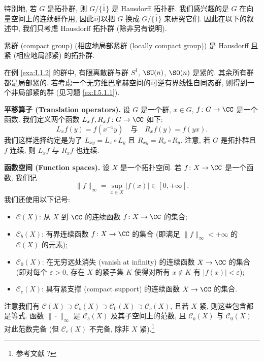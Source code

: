 \begin{remark}[Hausdorff 化]
\label{rem:I.1.8}
特别地, 若 $G$ 是拓扑群, 则 $G/\overline{\{1\}}$ 是 Hausdorff 拓扑群. 我们感兴趣的是 $G$ 在向量空间上的连续群作用, 因此可以把 $G$ 换成 $G/\overline{\{1\}}$ 来研究它们. 因此在以下的叙述中, 我们只考虑 Hausdorff 拓扑群 (除非另有说明).
\end{remark}

\begin{definition}
\label{def:I.1.9}
紧群 (compact group) (相应地局部紧群 (locally compact group)) 是 Hausdorff 且紧 (相应地局部紧) 的拓扑群.
\end{definition}

\begin{example}[紧群与局部紧群的例子]
\label{exa:I.1.10}
在例 \ref{exa:I.1.2} 的群中, 有限离散群与群 $S^1$, $\SU(n)$, $\SO(n)$ 是紧的. 其余所有群都是局部紧的. 若考虑一个无穷维巴拿赫空间的可逆有界线性自同态群, 则得到一个非局部紧的群 (见习题 \ref{ex:I.5.1.1}).
\end{example}

\textbf{平移算子 (Translation operators).} 设 $G$ 是一个群, $x \in G$, $f \colon G \to \CC$ 是一个函数. 我们定义两个函数 $L_xf, R_xf \colon G \to \CC$ 如下:
\[
L_xf(y) = f(x^{-1}y) \quad \text{与} \quad R_xf(y) = f(yx).
\]
我们这样选择约定是为了 $L_{xy} = L_x \circ L_y$ 且 $R_{xy} = R_x \circ R_y$. 注意, 若 $G$ 是拓扑群且 $f$ 连续, 则 $L_xf$ 与 $R_xf$ 也连续.

\textbf{函数空间 (Function spaces).} 设 $X$ 是一个拓扑空间. 若 $f \colon X \to \CC$ 是一个函数, 我们记
\[
\|f\|_{\infty} = \sup_{x \in X} |f(x)| \in [0, +\infty].
\]
我们还使用以下记号:
\begin{itemize}
\item $\mathcal{C}(X)$: 从 $X$ 到 $\CC$ 的连续函数 $f \colon X \to \CC$ 的集合;
\item $\mathcal{C}_b(X)$: 有界连续函数 $f \colon X \to \CC$ 的集合 (即满足 $\|f\|_{\infty} < +\infty$ 的 $\mathcal{C}(X)$ 的元素);
\item $\mathcal{C}_0(X)$: 在无穷远处消失 (vanish at infinity) 的连续函数 $X \to \CC$ 的集合 (即对每个 $\varepsilon > 0$, 存在 $X$ 的紧子集 $K$ 使得对所有 $x \notin K$ 有 $|f(x)| < \varepsilon$);
\item $\mathcal{C}_c(X)$: 具有紧支撑 (compact support) 的连续函数 $X \to \CC$ 的集合.
\end{itemize}
注意我们有 $\mathcal{C}(X) \supset \mathcal{C}_b(X) \supset \mathcal{C}_0(X) \supset \mathcal{C}_c(X)$, 且若 $X$ 紧, 则这些包含都是等式. 函数 $\|\cdot\|_{\infty}$ 是 $\mathcal{C}_b(X)$ 及其子空间上的范数, 且 $\mathcal{C}_b(X)$ 与 $\mathcal{C}_0(X)$ 对此范数完备 (但 $\mathcal{C}_c(X)$ 不完备, 除非 $X$ 紧).\footnote{参考文献 ?}

